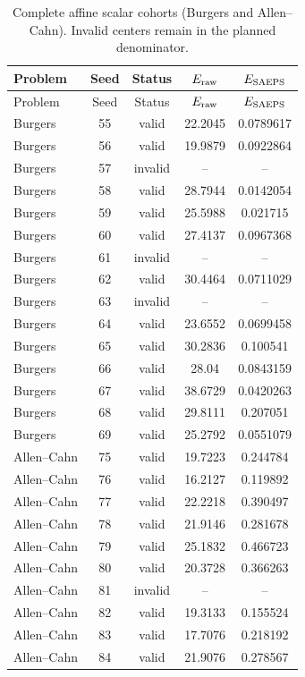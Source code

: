 \begin{longtable}{lScSS}
\caption{Complete affine scalar cohorts (Burgers and Allen--Cahn). Invalid centers remain in the planned denominator.}\label{tab:historical_all}\\
\toprule
Problem & {Seed} & Status & {$E_{\rm raw}$} & {$E_{\rm SAEPS}$} \\
\midrule\endfirsthead
\toprule
Problem & {Seed} & Status & {$E_{\rm raw}$} & {$E_{\rm SAEPS}$} \\
\midrule\endhead
Burgers & 55 & valid & 22.2045 & 0.0789617 \\
Burgers & 56 & valid & 19.9879 & 0.0922864 \\
Burgers & 57 & invalid & {--} & {--} \\
Burgers & 58 & valid & 28.7944 & 0.0142054 \\
Burgers & 59 & valid & 25.5988 & 0.021715 \\
Burgers & 60 & valid & 27.4137 & 0.0967368 \\
Burgers & 61 & invalid & {--} & {--} \\
Burgers & 62 & valid & 30.4464 & 0.0711029 \\
Burgers & 63 & invalid & {--} & {--} \\
Burgers & 64 & valid & 23.6552 & 0.0699458 \\
Burgers & 65 & valid & 30.2836 & 0.100541 \\
Burgers & 66 & valid & 28.04 & 0.0843159 \\
Burgers & 67 & valid & 38.6729 & 0.0420263 \\
Burgers & 68 & valid & 29.8111 & 0.207051 \\
Burgers & 69 & valid & 25.2792 & 0.0551079 \\
Allen--Cahn & 75 & valid & 19.7223 & 0.244784 \\
Allen--Cahn & 76 & valid & 16.2127 & 0.119892 \\
Allen--Cahn & 77 & valid & 22.2218 & 0.390497 \\
Allen--Cahn & 78 & valid & 21.9146 & 0.281678 \\
Allen--Cahn & 79 & valid & 25.1832 & 0.466723 \\
Allen--Cahn & 80 & valid & 20.3728 & 0.366263 \\
Allen--Cahn & 81 & invalid & {--} & {--} \\
Allen--Cahn & 82 & valid & 19.3133 & 0.155524 \\
Allen--Cahn & 83 & valid & 17.7076 & 0.218192 \\
Allen--Cahn & 84 & valid & 21.9076 & 0.278567 \\
\bottomrule
\end{longtable}
